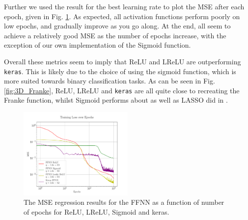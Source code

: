 \documentclass[%
reprint,s
amsmath,amssymb,
aps,
]{revtex4-2}
\begin{document}
Further we used the result for the best learning rate to plot the MSE after each epoch, given in Fig. \ref{fig:NN_Franke_Epochs}. As expected, all activation functions perform poorly on low epochs, and gradually improve as you go along. At the end, all seem to achieve a relatively good MSE as the number of epochs increase, with the exception of our own implementation of the Sigmoid function.

Overall these metrics seem to imply that ReLU and LReLU are outperforming \texttt{keras}. This is likely due to the choice of using the sigmoid function, which is more suited towards binary classification tasks. As can be seen in Fig. \ref{fig:3D_Franke}, ReLU, LReLU and \texttt{keras} are all quite close to recreating the Franke function, whilst Sigmoid performs about as well as LASSO did in \cite{project1}.
\begin{figure}[ht!]
	\includegraphics[width=0.5\textwidth]{Figures/NN_MSE_Franke_Epoch.pdf}
	\caption{The MSE regression results for the FFNN as a function of number of epochs for ReLU, LReLU, Sigmoid and keras.}
	\label{fig:NN_Franke_Epochs}
\end{figure}
\end{document}
